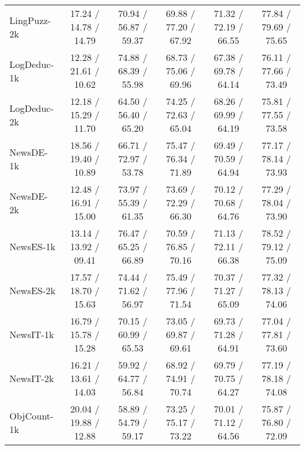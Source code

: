 \begin{table*}[h]
\begin{tabular}{lccccc}
LingPuzz-2k
& 
17.24 / 14.78 / 14.79
& 70.94 / 56.87 / 59.37
& 69.88 / 77.20 / 67.92
& 
71.32 / 72.19 / 66.55
& 





77.84 / 79.69 / 75.65
\\

LogDeduc-1k
& 
12.28 / 21.61 / 10.62
& 74.88 / 68.39 / 55.98
& 68.73 / 75.06 / 69.96
& 67.38 / 69.78 / 64.14
& 
76.11 / 77.66 / 73.49
\\

LogDeduc-2k
& 
12.18 / 15.29 / 11.70
& 64.50 / 56.40 / 65.20
& 74.25 / 72.63 / 65.04
& 
68.26 / 69.99 / 64.19
& 






75.81 / 77.55 / 73.58
\\
NewsDE-1k
& 18.56 / 19.40 / 10.89
& 66.71 / 72.97 / 53.78
& 75.47 / 76.34 / 71.89
& 69.49 / 70.59 / 64.94
& 77.17 / 78.14 / 73.93
\\

NewsDE-2k
& 
12.48 / 16.91 / 15.00
& 73.97 / 55.39 / 61.35
& 73.69 / 72.29 / 66.30
& 
70.12 / 70.68 / 64.76
& 





77.29 / 78.04 / 73.90
\\

NewsES-1k
& 
13.14 / 13.92 / 09.41
& 76.47 / 65.25 / 66.89
& 70.59 / 76.85 / 70.16
& 71.13 / 72.11 / 66.38
& 
78.52 / 79.12 / 75.09
\\

NewsES-2k
& 
17.57 / 18.70 / 15.63
& 74.44 / 71.62 / 56.97
& 75.49 / 77.96 / 71.54
& 
70.37 / 71.27 / 65.09
& 






77.32 / 78.13 / 74.06
\\
NewsIT-1k
& 16.79 / 15.78 / 15.28
& 70.15 / 60.99 / 65.53
& 73.05 / 69.87 / 69.61
& 69.73 / 71.28 / 64.91
& 77.04 / 77.81 / 73.60
\\

NewsIT-2k
& 
16.21 / 13.61 / 14.03
& 59.92 / 64.77 / 56.84
& 68.92 / 74.91 / 70.74
& 
69.79 / 70.75 / 64.27
& 





77.19 / 78.18 / 74.08
\\

ObjCount-1k
& 
20.04 / 19.88 / 12.88
& 58.89 / 54.79 / 59.17
& 73.25 / 75.17 / 73.22
& 70.01 / 71.12 / 64.56
& 
75.87 / 76.80 / 72.09
\\


\end{tabular}
\end{table*}
